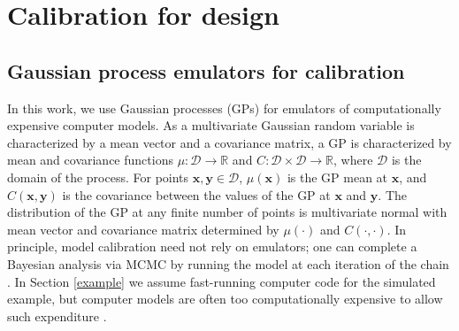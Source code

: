 \documentclass[twocolumn,10pt]{asme2ej}
\begin{document}
%

%
\section{Calibration for design}\label{calib_for_design}

%
\subsection{Gaussian process emulators for calibration}
%
In this work, we use Gaussian processes (GPs) for emulators of computationally expensive computer models.
%
As a multivariate Gaussian random variable is characterized by a mean vector and a covariance matrix, a GP is characterized by mean and covariance functions $\mu:\mathcal D\to \mathbb R$ and $C:\mathcal D\times \mathcal D\to \mathbb R$, where $\mathcal D$ is the domain of the process. 
%
For points $\mathbf x,\mathbf y\in \mathcal D$, $\mu(\mathbf x)$ is the GP mean at $\mathbf x$, and $C(\mathbf x, \mathbf y)$ is the covariance between the values of the GP at $\mathbf x$ and $\mathbf y$.
%
The distribution of the GP at any finite number of points is multivariate normal with mean vector and covariance matrix determined by $\mu(\cdot)$ and $C(\cdot,\cdot)$.
%
In principle, model calibration need not rely on emulators; one can complete a Bayesian analysis via MCMC by running the model at each iteration of the chain \cite{Hemez2011}. 
%
In Section \ref{example} we assume fast-running computer code for the simulated example, but
%
computer models are often too computationally expensive to allow such expenditure \cite{VanBuren2013,VanBuren2014}.
%
%
\end{document}
